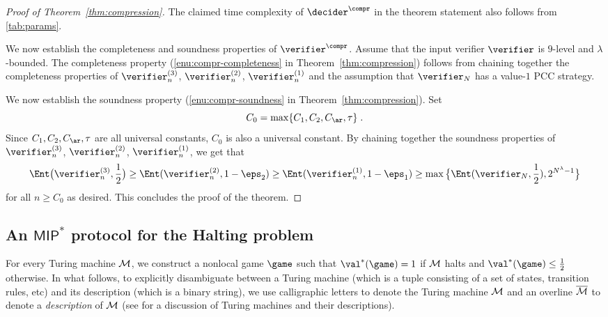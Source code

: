 \begin{proof}[Proof of Theorem~\ref{thm:compression}]
  The claimed time complexity of $\decider^\compr$ in the theorem statement
  also follows from \cref{tab:params}. 

  We now establish the completeness and soundness properties of
  $\verifier^\compr$.
  Assume that the input verifier $\verifier$ is $9$-level and $\lambda$-bounded. 
The completeness property (\cref{enu:compr-completeness} in
  Theorem~\ref{thm:compression}) follows from chaining together the completeness
  properties of $\verifier^{(3)}_n$, $\verifier^{(2)}_n$, $\verifier^{(1)}_n$
  and the assumption that $\verifier_N$ has a value-$1$ PCC strategy.

  We now establish the soundness property (\cref{enu:compr-soundness} in
  Theorem~\ref{thm:compression}). Set 
    \begin{equation}
  \label{eq:c_0-recursive}
  	C_0 = \max \{ C_1, C_2, C_\ar,\tau \} \;.
  \end{equation}
  Since $C_1, C_2, C_\ar, \tau$ are all universal constants, $C_0$ is also a universal constant.
 By chaining together the soundness properties of $\verifier^{(3)}_n$, $\verifier^{(2)}_n$, $\verifier^{(1)}_n$, 
 we get that 
 \[
 	\Ent \big(
    \verifier_n^{(3)}, \frac{1}{2} \big) \geq \Ent(\verifier_n^{(2)}, 1 - \eps_2)
 \geq \Ent(\verifier_n^{(1)}, 1 - \eps_1) \geq \max \big
    \{\Ent(\verifier_N, \frac{1}{2}), 2^{N^\lambda - 1} \big \}
 \]
 for all $n \geq C_0$ as desired. This concludes the proof of the theorem.
\end{proof}

\subsection{An $\mathsf{MIP}^*$ protocol for the Halting problem}
\label{sec:halt}

For every Turing machine $\cal{M}$, we construct a nonlocal game $\game$ such
that $\val^*(\game) = 1$ if $\cal{M}$ halts and $\val^*(\game) \le \frac{1}{2}$
otherwise.  In what follows, to explicitly disambiguate between 
a Turing machine (which is a tuple consisting of a set of states, transition rules, etc) and its description 
(which is a binary string), we use calligraphic letters to denote the Turing machine $\cal{M}$ and
an overline $\overline{\cal{M}}$ to denote a \emph{description} of $\cal{M}$ (see 
 for a discussion of Turing machines and their descriptions).

